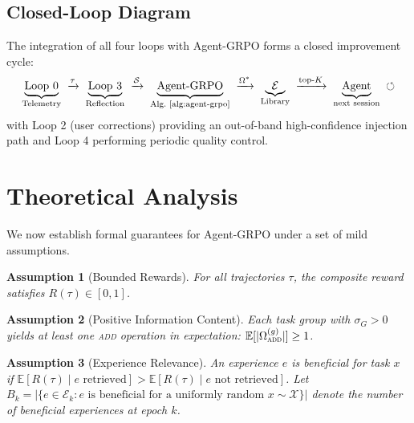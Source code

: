 \documentclass[11pt]{article}
\newtheorem{assumption}{Assumption}
\begin{document}
\subsection{Closed-Loop Diagram}

The integration of all four loops with Agent-GRPO forms a closed improvement
cycle:
\begin{equation}
    \underbrace{\text{Loop 0}}_{\text{Telemetry}}
    \;\xrightarrow{\tau}\;
    \underbrace{\text{Loop 3}}_{\text{Reflection}}
    \;\xrightarrow{\mathcal{S}}\;
    \underbrace{\text{Agent-GRPO}}_{\text{Alg.~\ref{alg:agent-grpo}}}
    \;\xrightarrow{\Omega^*}\;
    \underbrace{\mathcal{E}}_{\text{Library}}
    \;\xrightarrow{\text{top-}K}\;
    \underbrace{\text{Agent}}_{\text{next session}}
    \;\circlearrowleft
    \label{eq:closed-loop}
\end{equation}
with Loop 2 (user corrections) providing an out-of-band high-confidence
injection path and Loop 4 performing periodic quality control.

\section{Theoretical Analysis}
\label{sec:theory}

We now establish formal guarantees for Agent-GRPO under a set of mild
assumptions.

\begin{assumption}[Bounded Rewards]
\label{asm:bounded}
For all trajectories $\tau$, the composite reward satisfies $R(\tau) \in [0, 1]$.
\end{assumption}

\begin{assumption}[Positive Information Content]
\label{asm:info}
Each task group with $\sigma_G > 0$ yields at least one \textsc{add} operation
in expectation: $\mathbb{E}[|\Omega^{(g)}_{\textsc{add}}|] \geq 1$.
\end{assumption}

\begin{assumption}[Experience Relevance]
\label{asm:relevance}
An experience $e$ is \emph{beneficial} for task $x$ if $\mathbb{E}[R(\tau) \mid e \text{ retrieved}] > \mathbb{E}[R(\tau) \mid e \text{ not retrieved}]$.
Let $B_k = |\{e \in \mathcal{E}_k : e \text{ is beneficial for a uniformly random } x \sim \mathcal{X}\}|$
denote the number of beneficial experiences at epoch $k$.
\end{assumption}
\end{document}
